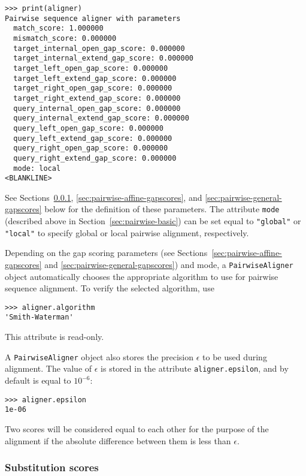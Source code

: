 \begin{verbatim}
>>> print(aligner)
Pairwise sequence aligner with parameters
  match_score: 1.000000
  mismatch_score: 0.000000
  target_internal_open_gap_score: 0.000000
  target_internal_extend_gap_score: 0.000000
  target_left_open_gap_score: 0.000000
  target_left_extend_gap_score: 0.000000
  target_right_open_gap_score: 0.000000
  target_right_extend_gap_score: 0.000000
  query_internal_open_gap_score: 0.000000
  query_internal_extend_gap_score: 0.000000
  query_left_open_gap_score: 0.000000
  query_left_extend_gap_score: 0.000000
  query_right_open_gap_score: 0.000000
  query_right_extend_gap_score: 0.000000
  mode: local
<BLANKLINE>
\end{verbatim}
See Sections~\ref{sec:pairwise-substitution-scores}, \ref{sec:pairwise-affine-gapscores}, and \ref{sec:pairwise-general-gapscores} below for the definition of these
parameters. The attribute \verb+mode+ (described above in Section~\ref{sec:pairwise-basic}) can be set equal to \verb+"global"+ or \verb+"local"+ to specify global or local pairwise alignment, respectively.

Depending on the gap scoring parameters
(see Sections~\ref{sec:pairwise-affine-gapscores} and
\ref{sec:pairwise-general-gapscores}) and mode, a \verb+PairwiseAligner+ object
automatically chooses the appropriate algorithm to use for pairwise sequence alignment. To verify the selected algorithm, use

\begin{verbatim}
>>> aligner.algorithm
'Smith-Waterman'
\end{verbatim}
This attribute is read-only.

A \verb+PairwiseAligner+ object also stores the precision $\epsilon$ to be used during alignment. The value of $\epsilon$ is stored in the attribute \verb+aligner.epsilon+, and by default is equal to $10^{-6}$:


\begin{verbatim}
>>> aligner.epsilon
1e-06
\end{verbatim}
Two scores will be considered equal to each other for the purpose of the alignment if the absolute difference between them is less than $\epsilon$.

\subsubsection{Substitution scores}
\label{sec:pairwise-substitution-scores}

